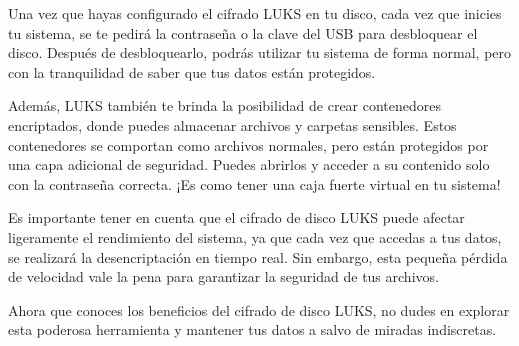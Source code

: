 \documentclass[
  letterpaper,
  DIV=11,
  numbers=noendperiod]{scrartcl}
\begin{document}
Una vez que hayas configurado el cifrado LUKS en tu disco, cada vez que
inicies tu sistema, se te pedirá la contraseña o la clave del USB para
desbloquear el disco. Después de desbloquearlo, podrás utilizar tu
sistema de forma normal, pero con la tranquilidad de saber que tus datos
están protegidos.

Además, LUKS también te brinda la posibilidad de crear contenedores
encriptados, donde puedes almacenar archivos y carpetas sensibles. Estos
contenedores se comportan como archivos normales, pero están protegidos
por una capa adicional de seguridad. Puedes abrirlos y acceder a su
contenido solo con la contraseña correcta. ¡Es como tener una caja
fuerte virtual en tu sistema!

Es importante tener en cuenta que el cifrado de disco LUKS puede afectar
ligeramente el rendimiento del sistema, ya que cada vez que accedas a
tus datos, se realizará la desencriptación en tiempo real. Sin embargo,
esta pequeña pérdida de velocidad vale la pena para garantizar la
seguridad de tus archivos.

Ahora que conoces los beneficios del cifrado de disco LUKS, no dudes en
explorar esta poderosa herramienta y mantener tus datos a salvo de
miradas indiscretas.


\printbibliography
\end{document}
